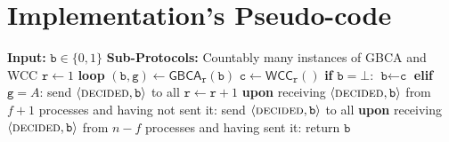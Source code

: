 \clearpage
\section{Implementation's Pseudo-code}

\begin{algorithm}
    \label{alg:ABA}
    \caption{Implementation of \textsf{ABA} from \cite{Abraham2022Efficient}}
    \begin{algorithmic}
        \State \textbf{Input:} $\texttt{b} \in \{0,1\}$
        \State \textbf{Sub-Protocols:} Countably many instances of \textsf{GBCA} and \textsf{WCC}
        \medskip
        \State $\texttt{r} \gets 1$
        \State \textbf{loop}
        \State \quad $(\texttt{b}, \texttt{g}) \gets \textsf{GBCA}_{\texttt{r}}(\texttt{b})$
        \State \quad  $\texttt{c} \gets \textsf{WCC}_{\texttt{r}}()$
        \State \quad \textbf{if} $\texttt{b} = \bot$:
        \State \quad\quad $\texttt{b} \gets \texttt{c}$
        \State \quad \textbf{elif} $\texttt{g} = A$:
        \State \quad\quad send $\langle\textsc{decided}, \texttt{b}\rangle$ to all
        \State \quad $\texttt{r} \gets \texttt{r} + 1$
        \medskip
        \State \textbf{upon} receiving $\langle\textsc{decided}, \texttt{b}\rangle$ from $f+1$
        processes and having not sent it:
        \State \quad send $\langle\textsc{decided}, \texttt{b}\rangle$ to all
        \State \textbf{upon} receiving $\langle\textsc{decided}, \texttt{b}\rangle$ from $n-f$
        processes and having sent it:
        \State \quad return $\texttt{b}$
    \end{algorithmic}
\end{algorithm}

